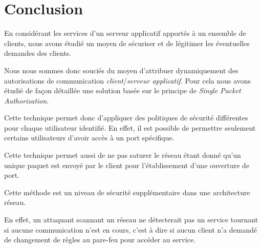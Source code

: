 \chapter*{Conclusion}

En considérant les services d'un serveur applicatif apportés à un ensemble de clients, nous avons étudié un moyen de sécuriser et de légitimer les éventuelles demandes des clients.

Nous nous sommes donc souciés du moyen d'attribuer dynamiquement des autorisations de communication \emph{client}/\emph{serveur applicatif}. Pour cela nous avons étudié de façon détaillée une solution basée sur le principe de \emph{Single Packet Authorization}.

 Cette technique permet donc d'appliquer des politiques de sécurité différentes pour chaque utilisateur identifié. En effet, il est possible de permettre seulement certains utilisateurs d'avoir accès à un port spécifique.

Cette technique permet aussi de ne pas saturer le réseau étant donné qu'un unique paquet est envoyé par le client pour l'établissement d'une ouverture de port.

Cette méthode est un niveau de sécurité supplémentaire dans une architecture réseau. 

En effet, un attaquant scannant un réseau ne détecterait pas un service tournant si aucune communication n'est en cours, c'est à dire si aucun client n'a demandé de changement de règles au pare-feu pour accéder au service.







